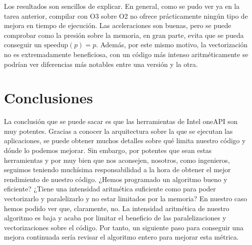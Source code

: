 \documentclass[12pt]{article}
\begin{document}
Los resultados son sencillos de explicar. En general, como se pudo ver ya en la tarea anterior, compilar con O3 sobre O2 no ofrece prácticamente ningún tipo de mejora en tiempo de ejecución. Las aceleraciones son buenas, pero se puede comprobar como la presión sobre la memoria, en gran parte, evita que se pueda conseguir un $\text{speedup}(p) = p$. Además, por este mismo motivo, la vectorización no es extremadamente beneficiosa, con un código más intenso aritméticamente se podrían ver diferencias más notables entre una versión y la otra.
\section{Conclusiones}
La conclusión que se puede sacar es que las herramientas de Intel oneAPI son muy potentes. Gracias a conocer la arquitectura sobre la que se ejecutan las aplicaciones, se puede obtener muchos detalles sobre qué limita nuestro código y dónde lo podemos mejorar. Sin embargo, por potentes que sean estas herramientas y por muy bien que nos aconsejen, nosotros, como ingenieros, seguimos teniendo muchísima responsabilidad a la hora de obtener el mejor rendimiento de nuestro código. ¿Hemos programado un algoritmo bueno y eficiente? ¿Tiene una intensidad aritmética suficiente como para poder vectorizarlo y paralelizarlo y no estar limitados por la memoria? En nuestro caso hemos podido ver que, claramente, no. La intensidad aritmética de nuestro algoritmo es baja y acaba por limitar el beneficio de las paralelizaciones y vectorizaciones sobre el código. Por tanto, un siguiente paso para conseguir una mejora continuada sería revisar el algoritmo entero para mejorar esta métrica.
\newpage
\end{document}
